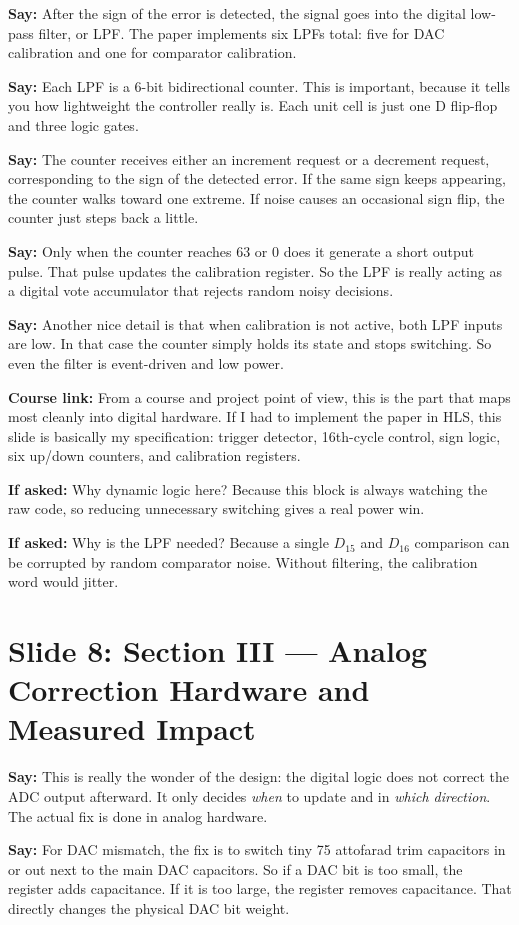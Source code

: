 \documentclass[11pt]{article}
\newcommand{\speak}[1]{\textbf{Say:} #1}
\newcommand{\ifasked}[1]{\textbf{If asked:} #1}
\newcommand{\course}[1]{\textbf{Course link:} #1}
\begin{document}
\speak{After the sign of the error is detected, the signal goes into the digital low-pass filter, or LPF. The paper implements six LPFs total: five for DAC calibration and one for comparator calibration.}

\speak{Each LPF is a 6-bit bidirectional counter. This is important, because it tells you how lightweight the controller really is. Each unit cell is just one D flip-flop and three logic gates.}

\speak{The counter receives either an increment request or a decrement request, corresponding to the sign of the detected error. If the same sign keeps appearing, the counter walks toward one extreme. If noise causes an occasional sign flip, the counter just steps back a little.}

\speak{Only when the counter reaches 63 or 0 does it generate a short output pulse. That pulse updates the calibration register. So the LPF is really acting as a digital vote accumulator that rejects random noisy decisions.}

\speak{Another nice detail is that when calibration is not active, both LPF inputs are low. In that case the counter simply holds its state and stops switching. So even the filter is event-driven and low power.}

\course{From a course and project point of view, this is the part that maps most cleanly into digital hardware. If I had to implement the paper in HLS, this slide is basically my specification: trigger detector, 16th-cycle control, sign logic, six up/down counters, and calibration registers.}

\ifasked{Why dynamic logic here? Because this block is always watching the raw code, so reducing unnecessary switching gives a real power win.}

\ifasked{Why is the LPF needed? Because a single $D_{15}$ and $D_{16}$ comparison can be corrupted by random comparator noise. Without filtering, the calibration word would jitter.}

\section*{Slide 8: Section III --- Analog Correction Hardware and Measured Impact}
\speak{This is really the wonder of the design: the digital logic does not correct the ADC output afterward. It only decides \emph{when} to update and in \emph{which direction}. The actual fix is done in analog hardware.}

\speak{For DAC mismatch, the fix is to switch tiny 75 attofarad trim capacitors in or out next to the main DAC capacitors. So if a DAC bit is too small, the register adds capacitance. If it is too large, the register removes capacitance. That directly changes the physical DAC bit weight.}
\end{document}
